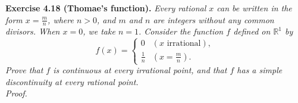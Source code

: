 \documentclass{article}
\begin{document}



\textbf{Exercise 4.18 (Thomae's function).}
\emph{Every rational $x$ can be written in the form $x = \frac{m}{n}$, where $n > 0$,
and $m$ and $n$ are integers without any common divisors.
When $x = 0$, we take $n = 1$.
Consider the function $f$ defined on $\mathbb{R}^1$ by
\begin{equation*}
  f(x) =
    \begin{cases}
      0           & (\text{$x$ irrational}), \\
      \frac{1}{n} & (x = \frac{m}{n}).
    \end{cases}
\end{equation*}
Prove that $f$ is continuous at every irrational point,
and that $f$ has a simple discontinuity at every rational point.} \\

\emph{Proof.}
\end{document}
